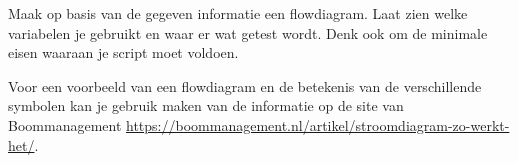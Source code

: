 Maak op basis van de gegeven informatie een flowdiagram. Laat zien welke variabelen je gebruikt en waar er wat getest wordt. Denk ook om de minimale eisen waaraan je script moet voldoen.

Voor een voorbeeld van een flowdiagram en de betekenis van de verschillende symbolen kan je gebruik maken van de informatie op de site van Boommanagement \url{https://boommanagement.nl/artikel/stroomdiagram-zo-werkt-het/}.

